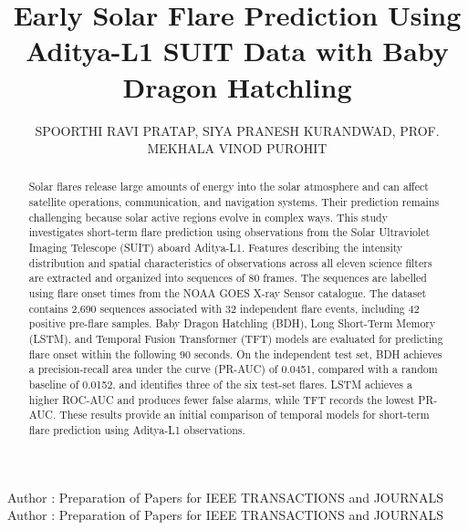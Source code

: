 \documentclass[oneside]{ieeeaccess}
\begin{document}

\title{Early Solar Flare Prediction Using Aditya-L1 SUIT Data with Baby Dragon Hatchling}

\author{\uppercase{Spoorthi Ravi Pratap},
\uppercase{Siya Pranesh Kurandwad},
\uppercase{Prof. Mekhala Vinod Purohit}}

\address[1]{Department of Computer Science and Engineering, R V College of Engineering, Bangalore, Karnataka, India (e-mail: spoorthiravip.cs23@rvce.edu.in, siyapkurandwad.cs23@rvce.edu.in, mekhalap@rvce.edu.in)}

\markboth
{Author \headeretal: Preparation of Papers for IEEE TRANSACTIONS and JOURNALS}
{Author \headeretal: Preparation of Papers for IEEE TRANSACTIONS and JOURNALS}


\begin{abstract}
Solar flares release large amounts of energy into the solar atmosphere and can affect satellite operations, communication, and navigation systems. Their prediction remains challenging because solar active regions evolve in complex ways. This study investigates short-term flare prediction using observations from the Solar Ultraviolet Imaging Telescope (SUIT) aboard Aditya-L1. Features describing the intensity distribution and spatial characteristics of observations across all eleven science filters are extracted and organized into sequences of 80 frames. The sequences are labelled using flare onset times from the NOAA GOES X-ray Sensor catalogue. The dataset contains 2,690 sequences associated with 32 independent flare events, including 42 positive pre-flare samples. Baby Dragon Hatchling (BDH), Long Short-Term Memory (LSTM), and Temporal Fusion Transformer (TFT) models are evaluated for predicting flare onset within the following 90 seconds. On the independent test set, BDH achieves a precision-recall area under the curve (PR-AUC) of 0.0451, compared with a random baseline of 0.0152, and identifies three of the six test-set flares. LSTM achieves a higher ROC-AUC and produces fewer false alarms, while TFT records the lowest PR-AUC. These results provide an initial comparison of temporal models for short-term flare prediction using Aditya-L1 observations.
\end{abstract}
\end{document}
